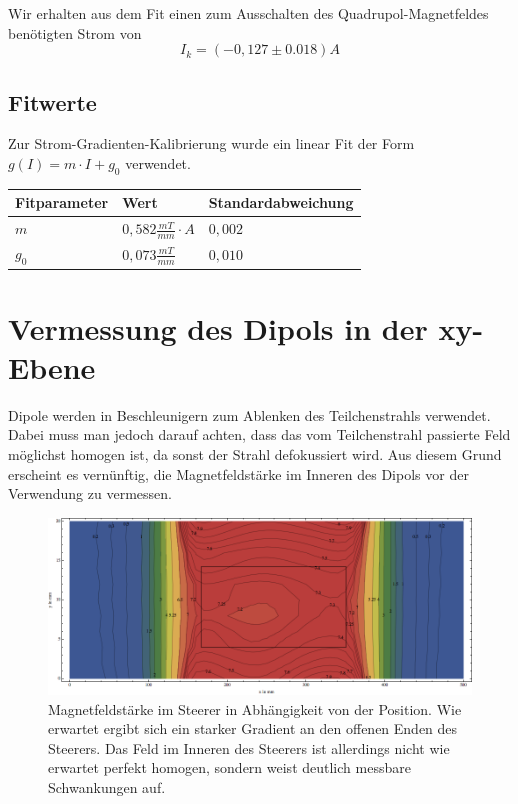 \documentclass[bigchapter,colorback,accentcolor=tud4b,linedtoc,11pt]{tudreport}
\begin{document}
Wir erhalten aus dem Fit einen zum Ausschalten des Quadrupol-Magnetfeldes benötigten Strom von $$I_k=(-0,127 \pm 0.018)A$$
\subsection{Fitwerte}

Zur Strom-Gradienten-Kalibrierung wurde ein linear Fit der Form $g(I) = m \cdot I + g_0$ verwendet.
\begin{center}
  \begin{tabular}{|p{2.6cm}|p{2.6cm}|p{3.5cm}|}
    \hline
    Fitparameter & Wert    & Standardabweichung \\ \hline
    $m$          & $0,582 \frac{mT}{mm} \cdot A$ & $0,002$            \\ \hline
    $g_0$        & $0,073 \frac{mT}{mm}$ & $0,010$            \\ \hline
	\end{tabular}
\end{center}

\clearpage{}
\section{Vermessung des Dipols in der xy-Ebene}

Dipole werden in Beschleunigern zum Ablenken des Teilchenstrahls verwendet. Dabei muss man jedoch darauf achten, dass das vom Teilchenstrahl passierte Feld möglichst homogen ist, da sonst der Strahl defokussiert wird. Aus diesem Grund erscheint es vernünftig, die Magnetfeldstärke im Inneren des Dipols vor der Verwendung zu vermessen.

\begin{figure}[H]
\centering
\includegraphics[width=1\textwidth]{img/steererxy.png}
\caption{Magnetfeldstärke im Steerer in Abhängigkeit von der Position. Wie erwartet ergibt sich ein starker Gradient an den offenen Enden des Steerers. Das Feld im Inneren des Steerers ist allerdings nicht wie erwartet perfekt homogen, sondern weist deutlich messbare Schwankungen auf.}
\end{figure}
\end{document}
